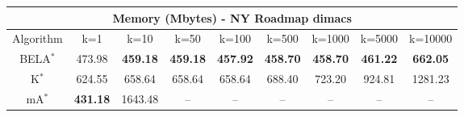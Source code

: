 \begin{tabular}{c|cccccccc}\toprule
\multicolumn{9}{c}{Memory (Mbytes) - NY Roadmap dimacs}\\ \midrule
Algorithm & k=1 & k=10 & k=50 & k=100 & k=500 & k=1000 & k=5000 & k=10000 \\ \midrule
BELA$^*$ & 473.98 & \textbf{459.18} & \textbf{459.18} & \textbf{457.92} & \textbf{458.70} & \textbf{458.70} & \textbf{461.22} & \textbf{662.05} \\
K$^*$ & 624.55 & 658.64 & 658.64 & 658.64 & 688.40 & 723.20 & 924.81 & 1281.23 \\
mA$^*$ & \textbf{431.18} & 1643.48 & -- & -- & -- & -- & -- & -- \\ \bottomrule 
\end{tabular}
